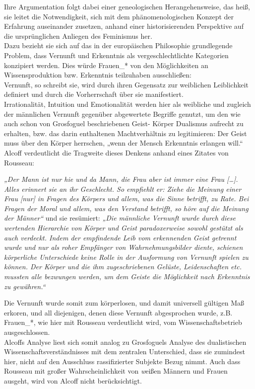\noindent Ihre Argumentation folgt dabei
einer geneologischen Herangehensweise, das heiß, sie leitet die Notwendigkeit,
sich mit dem phänomenologischen Konzept der Erfahrung auseinander zusetzen,
anhand einer historisierenden Perspektive auf die ursprünglichen Anliegen des
Feminismus her. \\
Dazu bezieht sie sich auf das in der europäischen Philosophie
grundlegende Problem, dass Vernunft und Erkenntnis als vergeschlechtlichte
Kategorien konzipiert werden. Dies würde Frauen\_* von den Möglichkeiten an
Wissensproduktion bzw. Erkenntnis teilzuhaben ausschließen: \\
Vernunft, so
schreibt sie, wird durch ihren Gegensatz zur weiblichen Leiblichkeit definiert
und durch die Vorherrschaft über sie manifestiert.\footnotemark{} \\
Irrationalität, Intuition und
Emotionalität werden hier als weibliche und zugleich der männlichen Vernunft
gegenüber abgewertete Begriffe genutzt, um den wie auch schon von Grosfoguel
beschriebenen Geist- Körper Dualismus aufrecht zu erhalten, bzw. das darin
enthaltenen Machtverhältnis zu legitimieren: Der Geist muss über den Körper
herrschen, „wenn der Mensch Erkenntnis erlangen will.“\footnotemark
{}\\
Alcoff verdeutlicht die Tragweite dieses Denkens anhand eines Zitates von Rousseau:
\begin{myenv}
 \textit{
 „Der Mann ist nur hie und da Mann, die Frau aber ist immer eine Frau
 […]. Alles erinnert sie an ihr Geschlecht. So empfiehlt er: Ziehe die Meinung
 einer Frau [nur] in Fragen des Körpers und allem, was die Sinne betrifft, zu
 Rate. Bei Fragen der Moral und allem, was den Verstand betrifft, so höre auf
 die Meinung der Männer“\footnotemark {}} und sie resümiert: \textit{ „Die männliche Vernunft wurde
 durch diese wertenden Hierarchie von Körper und Geist paradoxerweise sowohl
 gestützt als auch verdeckt. Indem der empfindende Leib vom erkennenden Geist
 getrennt wurde und nur als roher Empfänger von Wahrnehmungsbilder diente,
 schienen körperliche Unterschiede keine Rolle in der Ausformung von Vernunft
 spielen zu können. Der Körper und die ihm zugeschriebenen Gelüste,
 Leidenschaften etc. mussten alle bezwungen werden, um dem Geiste die
Möglichkeit nach Erkenntnis zu gewähren.“\footnotemark {} } \end{myenv}
Die Vernunft wurde somit zum körperlosen, und damit universell gültigen Maß
erkoren, und all diejenigen, denen diese Vernunft abgesprochen wurde, z.B.
Frauen\_*, wie hier mit Rousseau verdeutlicht wird, vom Wissenschaftsbetrieb
ausgeschlossen. \\
Alcoffs Analyse liest sich somit analog zu Grosfoguels Analyse
des dualistischen Wissenschaftsverständnisses mit dem zentralen Unterschied,
dass sie zumindest hier, nicht auf den Ausschluss rassifizierter Subjekte Bezug
nimmt. Auch dass Rousseau mit großer Wahrscheinlichkeit von \textit{w}eißen Männern und
Frauen ausgeht, wird von Alcoff nicht berücksichtigt.\\ 

